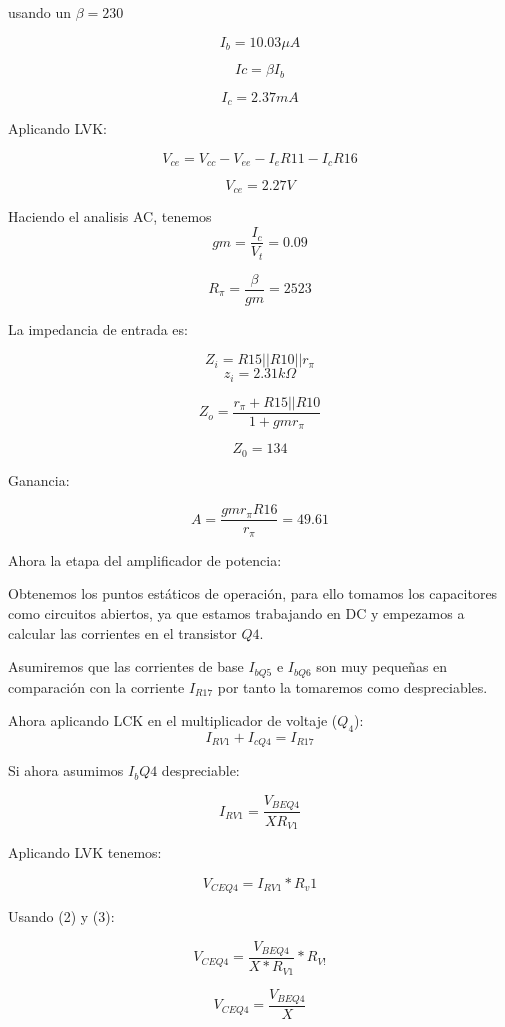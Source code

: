 \documentclass{article}
\begin{document}
usando un $\beta = 230$

$$ I_b = 10.03 \mu A$$

$$Ic = \beta I_b$$

$$I_c = 2.37 mA$$

Aplicando LVK:

$$V_{ce} = V_{cc} - V_{ee} - I_eR11 - I_cR16$$

$$ V_{ce} = 2.27 V$$

Haciendo el analisis AC, tenemos 
$$gm = \frac{I_{c}}{V_t} = 0.09$$

$$R_{\pi} = \frac{\beta}{gm} = 2523$$

La impedancia de entrada es:

$$Z_i = R15 || R10 || r_\pi $$
$$z_i = 2.31 k \Omega $$

$$Z_o = \frac{r_\pi + R15 || R10}{1 + gmr_\pi} $$

$$Z_0 = 134$$

Ganancia:

$$A = \frac{gmr_\pi R16}{r_\pi} = 49.61$$

Ahora la etapa del amplificador de potencia:

Obtenemos los puntos estáticos de operación, para ello tomamos los capacitores como circuitos abiertos, ya que estamos trabajando en DC y empezamos a calcular las corrientes en el transistor $Q4$.

Asumiremos que las corrientes de base $I_{bQ5}$ e $I_{bQ6}$ son muy pequeñas en comparación con la corriente $I_{R17}$ por tanto la tomaremos como despreciables.

Ahora aplicando LCK en el multiplicador de voltaje ($Q_4$):
\begin{equation}
I_{RV1} + I_{cQ4} = I_{R17}    
\end{equation}

Si ahora asumimos $I_bQ4$ despreciable:

\begin{equation}
    I_{RV1} = \frac{V_{BEQ4}}{XR_{V1}}
\end{equation}

Aplicando LVK tenemos:

\begin{equation}
    V_{CEQ4} = I_{RV1} * R_v1
\end{equation}

Usando (2) y (3):

$$ V_{CEQ4} = \frac{V_{BEQ4}}{X*R_{V1}} * R_{V!}$$

\begin{equation}
    V_{CEQ4} = \frac{V_{BEQ4}}{X}
\end{equation}
\end{document}
